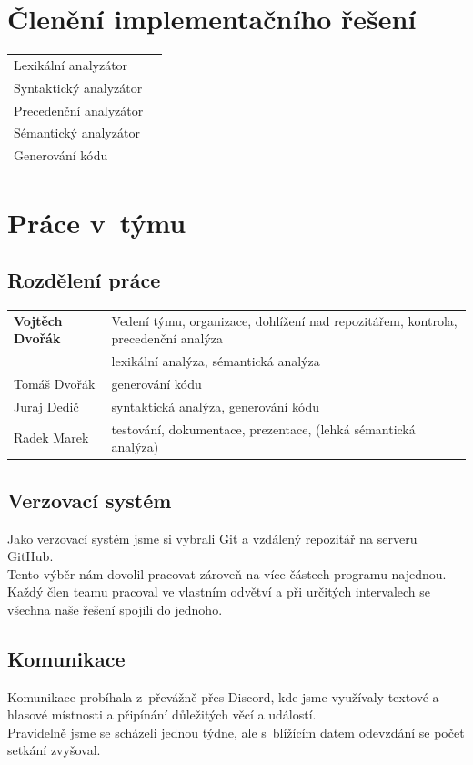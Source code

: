 \documentclass[11pt]{article}
\begin{document}
    \section{Členění implementačního řešení}
        \begin{tabular}{l l}
            Lexikální analyzátor & \\
            Syntaktický analyzátor & \\ 
            Precedenční analyzátor & \\
            Sémantický analyzátor & \\
            Generování kódu &
        \end{tabular}
        
    \vspace{10mm}
    \section{Práce v~týmu}
    
    \subsection{Rozdělení práce}
        \begin{tabular}{l  l}
                \textbf{Vojtěch Dvořák} & Vedení týmu, organizace, dohlížení nad repozitářem, kontrola,             precedenční analýza  \\
                        & lexikální analýza, sémantická analýza\\
                Tomáš Dvořák & generování kódu   \\
                Juraj Dedič & syntaktická analýza, generování kódu \\
                Radek Marek & testování, dokumentace, prezentace, (lehká sémantická analýza) 
        \end{tabular}
    
    \subsection{Verzovací systém}
        Jako verzovací systém jsme si vybrali Git a vzdálený repozitář na serveru GitHub. \\
    	\indent Tento výběr nám dovolil pracovat zároveň na více částech programu najednou. Každý člen teamu pracoval ve vlastním odvětví a při určitých intervalech se všechna naše řešení spojili do jednoho. 

    \subsection{Komunikace}
        Komunikace probíhala z~převážně přes Discord, kde jsme využívaly textové a hlasové místnosti a připínání důležitých věcí a událostí. \\
    	\indent Pravidelně jsme se scházeli jednou týdne, ale s~blížícím datem odevzdání se počet setkání zvyšoval. 
    	
\end{document}
